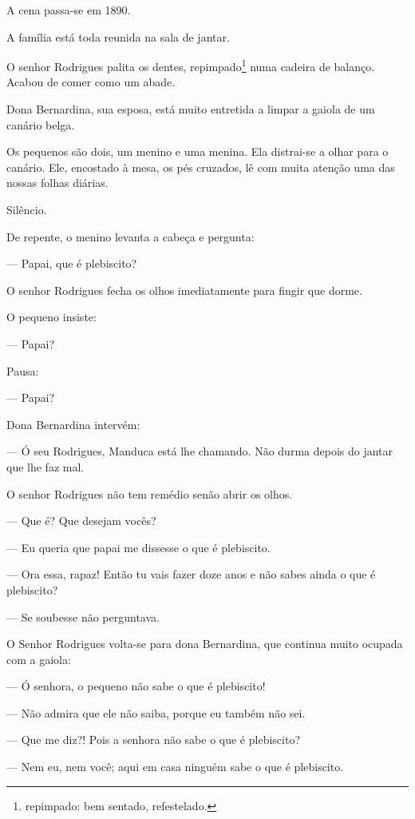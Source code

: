 
\noindent{}A cena passa-se em 1890.

A família está toda reunida na sala de jantar.

O senhor Rodrigues palita os dentes, repimpado\footnote{repimpado: bem
  sentado, refestelado.} numa cadeira de balanço. Acabou de comer como
um abade.

Dona Bernardina, sua esposa, está muito entretida a limpar a gaiola de
um canário belga.

Os pequenos são dois, um menino e uma menina. Ela distrai-se a olhar
para o canário. Ele, encostado à mesa, os pés cruzados, lê com muita
atenção uma das nossas folhas diárias.

Silêncio.

De repente, o menino levanta a cabeça e pergunta:

--- Papai, que é plebiscito?

O senhor Rodrigues fecha os olhos imediatamente para fingir que dorme.

O pequeno insiste:

--- Papai?

Pausa:

--- Papai?

Dona Bernardina intervém:

--- Ó seu Rodrigues, Manduca está lhe chamando. Não durma depois do
jantar que lhe faz mal.

O senhor Rodrigues não tem remédio senão abrir os olhos.

--- Que é? Que desejam vocês?

--- Eu queria que papai me dissesse o que é plebiscito.

--- Ora essa, rapaz! Então tu vais fazer doze anos e não sabes ainda o
que é plebiscito?

--- Se soubesse não perguntava.

O Senhor Rodrigues volta-se para dona Bernardina, que continua muito
ocupada com a gaiola:

--- Ó senhora, o pequeno não sabe o que é plebiscito!

--- Não admira que ele não saiba, porque eu também não sei.

--- Que me diz?! Pois a senhora não sabe o que é plebiscito?

--- Nem eu, nem você; aqui em casa ninguém sabe o que é plebiscito.

